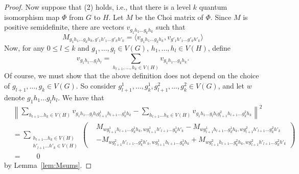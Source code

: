 \documentclass[a4paper,onecolumn,11pt,accepted=2026-01-06]{quantumarticle}
\theoremstyle{plain}
\theoremstyle{remark}
\theoremstyle{definition}
\begin{document}
\begin{proof}
Now suppose that (2) holds, i.e., that there is a level $k$ quantum isomorphism map $\Phi$ from $G$ to $H$. Let $M$ be the Choi matrix of $\Phi$. Since $M$ is positive semidefinite, there are vectors $v_{g_1h_1\ldots g_kh_k}$ such that
\begin{equation}
    M_{g_1h_1\ldots g_kh_k,g'_{1}h'_{1}\ldots g'_{k}h'_{k}} = \langle v_{g_1h_1\ldots g_kh_k}, v_{g'_{1}h'_{1}\ldots g'_{k}h'_{k}}\rangle
\end{equation}
Now, for any $0 \le l \le k$ and $g_1, \ldots, g_l \in V(G)$, $h_1, \ldots, h_l \in V(H)$, define
\begin{equation}
    v_{g_1h_1\ldots g_lh_l} = \sum_{h_{l+1},\ldots, h_{k} \in V(H)} v_{g_1h_1\ldots g_kh_k}.
\end{equation}
Of course, we must show that the above definition does not depend on the choice of $g_{l+1}, \ldots, g_{k} \in V(G)$. So consider $g^1_{l+1}, \ldots, g^1_{k}, g^2_{l+1}, \ldots, g^2_{k} \in V(G)$, and let $w$ denote $g_1h_1\ldots g_lh_l$. We have that
\begin{align*}
        & \left \| \sum_{h_{l+1} \dots h_k \in V(H) } v_{g_1h_1 \dots g_l h_l g^1_{l+1}h_{l+1} \dots g^1_k h_k} - \sum_{h_{l+1} \dots h_k \in V(H)} v_{g_1h_1 \dots g_l h_l g^2_{l+1}h_{l+1} \dots g^2_k h_k} \right\| ^2 \\
        & = \sum_{\substack{h_{l+1} \dots h_k \in V(H) \\ h'_{l+1} \dots h'_k \in V(H)}} \left( \begin{aligned} & M_{w g^1_{l+1}h_{l+1} \dots g^1_k h_k, w g^1_{l+1}h'_{l+1} \dots g^1_k h'_k} - M_{w g^1_{l+1}h_{l+1} \dots g^1_k h_k, w g^2_{l+1}h'_{l+1} \dots g^2_k h'_k} \\
        & - M_{w g^2_{l+1}h'_{l+1} \dots g^2_k h'_k, w g^1_{l+1}h_{l+1} \dots g^1_k h_k} + M_{w g^2_{l+1}h_{l+1} \dots g^2_k h_k, w g^2_{l+1}h'_{l+1} \dots g^2_k h'_k} 
        \end{aligned} \right ) \\
        & = \qquad 0
    \end{align*}
by Lemma~\ref{lem:Msums}.


\end{proof}
\end{document}
